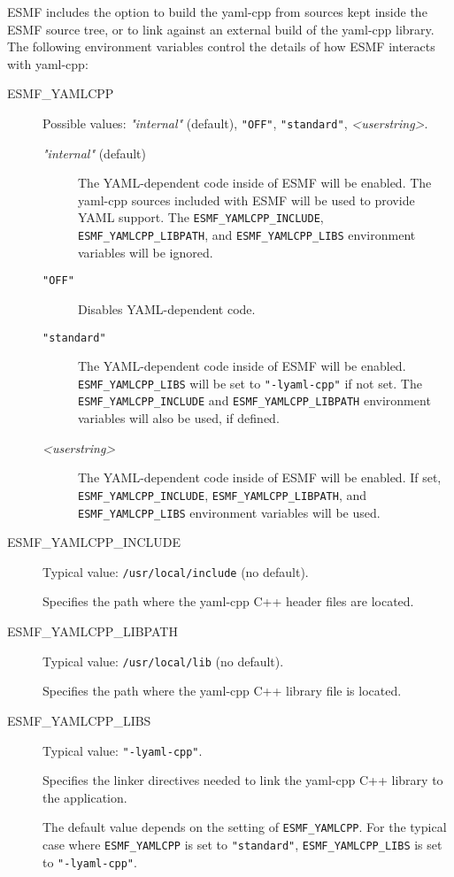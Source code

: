 ESMF includes the option to build the yaml-cpp from sources kept inside the
ESMF source tree, or to link against an external build of the yaml-cpp library.
The following environment variables control the details of how ESMF interacts
with yaml-cpp:

\begin{description}

\item[ESMF\_YAMLCPP] Possible values: {\it "internal"} (default), {\tt "OFF"},
{\tt "standard"}, {\it <userstring>}.

\begin{description}
\item[{\it "internal"} (default)] The YAML-dependent code inside of ESMF will 
be enabled.
The yaml-cpp sources included with ESMF will be used to provide YAML support.
The {\tt ESMF\_YAMLCPP\_INCLUDE}, {\tt ESMF\_YAMLCPP\_LIBPATH}, and
{\tt ESMF\_YAMLCPP\_LIBS} environment variables will be ignored. 

\item[{\tt "OFF"}] Disables YAML-dependent code.

\item[{\tt "standard"}] The YAML-dependent code inside of ESMF will 
be enabled.
{\tt ESMF\_YAMLCPP\_LIBS} will be set to {\tt "-lyaml-cpp"} if not set. 
The {\tt ESMF\_YAMLCPP\_INCLUDE} and {\tt ESMF\_YAMLCPP\_LIBPATH} environment
variables will also be used, if defined.

\item[{\it <userstring>}] The YAML-dependent code inside of ESMF will 
be enabled.
If set, {\tt ESMF\_YAMLCPP\_INCLUDE}, {\tt ESMF\_YAMLCPP\_LIBPATH}, and 
{\tt ESMF\_YAMLCPP\_LIBS} environment variables will be used.
\end{description}

\item[ESMF\_YAMLCPP\_INCLUDE] Typical value: {\tt /usr/local/include}
(no default).

Specifies the path where the yaml-cpp C++ header files are located.

\item[ESMF\_YAMLCPP\_LIBPATH] Typical value: {\tt /usr/local/lib} (no default).

Specifies the path where the yaml-cpp C++ library file is located.

\item[ESMF\_YAMLCPP\_LIBS] Typical value: {\tt "-lyaml-cpp"}.

Specifies the linker directives needed to link the yaml-cpp C++ library to
the application.

The default value depends on the setting of {\tt ESMF\_YAMLCPP}.  For the
typical case where {\tt ESMF\_YAMLCPP} is set to {\tt "standard"},
{\tt ESMF\_YAMLCPP\_LIBS} is set to {\tt "-lyaml-cpp"}.
\end{description}


